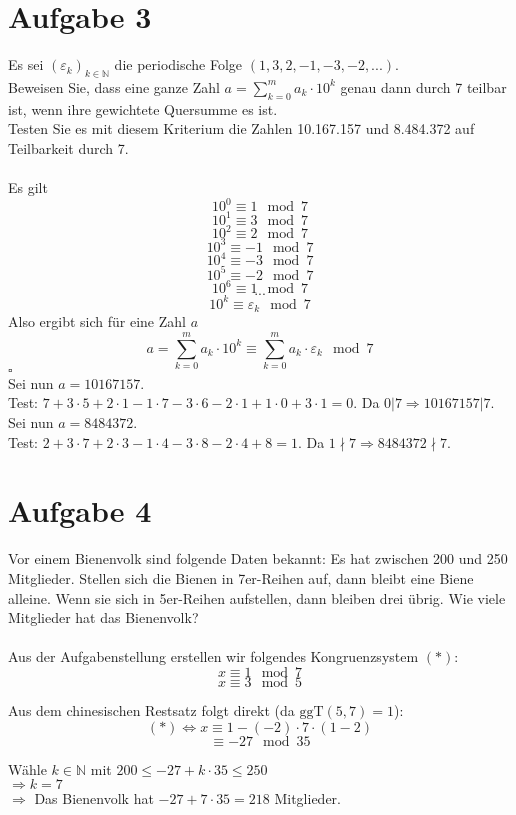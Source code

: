 \documentclass[11pt,a4paper,ngerman]{article}
\newcommand{\N}{\mathbb{N}}
\newcommand{\ggT}{\text{ggT}}
\begin{document}
\section*{Aufgabe 3}
Es sei $(\varepsilon_k)_{k \in \N}$ die periodische Folge $(1,3,2,-1,-3,-2,...)$. \\
Beweisen Sie, dass eine ganze Zahl $a = \sum_{k=0}^{m}{a_k \cdot 10^k}$ genau dann durch 7 teilbar ist, wenn ihre gewichtete Quersumme es ist.\\
Testen Sie es mit diesem Kriterium die Zahlen 10.167.157 und 8.484.372 auf Teilbarkeit durch 7.\\
\\
Es gilt
$$ 10^0 \equiv 1 \mod 7 $$
$$ 10^1 \equiv 3 \mod 7 $$
$$ 10^2 \equiv 2 \mod 7 $$
$$ 10^3 \equiv -1 \mod 7 $$
$$ 10^4 \equiv -3 \mod 7 $$
$$ 10^5 \equiv -2 \mod 7 $$
$$ 10^6 \equiv 1 \mod 7 $$
$$ ... $$
$$ 10^k \equiv \varepsilon_k \mod 7 $$
Also ergibt sich für eine Zahl $a$
$$ a = \sum_{k=0}^{m}{a_k \cdot 10^k} \equiv \sum_{k=0}^{m}{a_k \cdot \varepsilon_k} \mod 7 $$
\mbox{} \hfill $\square$
\\
Sei nun $a = 10167157$.\\
Test: $7 + 3\cdot 5 + 2\cdot 1 - 1\cdot 7 - 3 \cdot 6 - 2 \cdot 1 + 1 \cdot 0 + 3 \cdot 1 = 0$.
Da $0|7 \Rightarrow 10167157|7$.\\
Sei nun $a = 8484372$.\\
Test: $2 + 3 \cdot 7 + 2 \cdot 3 - 1 \cdot 4 - 3 \cdot 8 - 2 \cdot 4 + 8 = 1$.
Da $1\nmid 7 \Rightarrow 8484372\nmid7$.

\section*{Aufgabe 4}
Vor einem Bienenvolk sind folgende Daten bekannt: Es hat zwischen 200 und 250 Mitglieder. Stellen sich die Bienen in 7er-Reihen auf, dann bleibt eine Biene alleine. Wenn sie sich in 5er-Reihen aufstellen, dann bleiben drei übrig. Wie viele Mitglieder hat das Bienenvolk?\\
\\
Aus der Aufgabenstellung erstellen wir folgendes Kongruenzsystem $(*)$: \\

$$ x \equiv 1 \mod 7 $$
$$ x \equiv 3 \mod 5 $$

Aus dem chinesischen Restsatz folgt direkt (da $\ggT(5,7)=1$): \\

$$ (*) \Leftrightarrow x \equiv 1 - (-2) \cdot 7 \cdot (1-2)$$
$$ \equiv -27 \mod 35$$

Wähle $k \in \N$ mit $200 \leq -27 + k \cdot 35 \leq 250$ \\
$ \Rightarrow k = 7 $\\
$ \Rightarrow $ Das Bienenvolk hat $ -27 + 7 \cdot 35 = 218 $ Mitglieder.
\label{LastPage}
\end{document}
